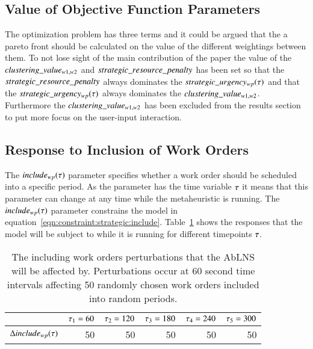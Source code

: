 \subsection{Value of Objective Function Parameters}
The optimization problem has three terms and it could be argued that the
a pareto front should be calculated on the value of the different weightings
between them. To not lose sight of the main contribution of the paper the
value of the $clustering\_value_{w1, w2}$ and
$strategic\_resource\_penalty$ has been set so
that the $strategic\_resource\_penalty$ always dominates the $strategic\_urgency_{w p}(\tau)$ and
that the $strategic\_urgency_{w p}(\tau)$ always dominates the $clustering\_value_{w1, w2}$.
Furthermore the $clustering\_value_{w1, w2}$ has been excluded from the results section
to put more focus on the user-input interaction.

\subsection{Response to Inclusion of Work Orders}\label{sec:response_work_orders}
The $include_{wp}(\tau)$ parameter specifies whether a work order
should be scheduled into a specific period. As the parameter has the time
variable $\tau$ it means that this parameter can change at any time
while the metaheuristic is running. The $include_{wp}(\tau)$ parameter
constrains the model in equation~\ref{eqn:constraint:strategic:include}.
Table~\ref{tab:responses:inclusion} shows the responses that the model will be
subject to while it is running for different timepoints $\tau$.

\begin{table}[H]
	\centering
	\begin{tabular}{lrrrrr}
	\toprule
	                                & $\tau_1 = 60$ & $\tau_2 = 120$ & $\tau_3 = 180$ & $\tau_4 = 240$ & $\tau_5 = 300$ \\ \midrule
	$\Delta include_{wp}(\tau)$ & 50                    & 50                     & 50                     & 50                     & 50                     \\ \bottomrule
	\end{tabular}
	\caption{The including work orders perturbations that the AbLNS will be affected by. 
		Perturbations occur at 60 second time intervals affecting 50 randomly chosen work orders included into random periods.
	}\label{tab:responses:inclusion}
\end{table}

